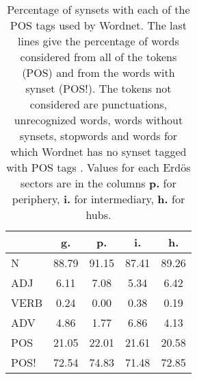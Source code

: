 \begin{table}[h!]
\begin{center}
\begin{tabular}{| l || c | c | c | c |}\hline
 & {\bf g.} & {\bf p.} & {\bf i.} & {\bf h.} \\\hline\hline
N & 88.79  & 91.15  & 87.41  & 89.26 \\\hline
ADJ & 6.11  & 7.08  & 5.34  & 6.42 \\\hline
VERB & 0.24  & 0.00  & 0.38  & 0.19 \\\hline
ADV & 4.86  & 1.77  & 6.86  & 4.13 \\\hline\hline
POS & 21.05  & 22.01  & 21.61  & 20.58 \\\hline
POS! & 72.54  & 74.83  & 71.48  & 72.85 \\\hline
\end{tabular}
\caption{Percentage of synsets with each of the POS tags used by Wordnet. The last lines give the percentage of words considered from all of the tokens (POS) and from the words with synset (POS!). The tokens not considered are punctuations, unrecognized words, words without synsets, stopwords and words for which Wordnet has no synset  tagged with POS tags . Values for each Erd\"os sectors are in the columns {{\bf p.}} for periphery, {{\bf i.}} for intermediary, {{\bf h.}} for hubs.}
\end{center}
\end{table}